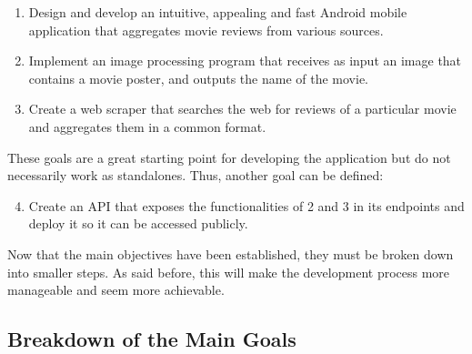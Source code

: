 \documentclass[12pt,a4paper,twoside]{report}
\begin{document}
\begin{enumerate}
    \item Design and develop an intuitive, appealing and fast Android mobile application that aggregates movie reviews from various sources.
    \item Implement an image processing program that receives as input an image that contains a movie poster, and outputs the name of the movie.
    \item Create a web scraper that searches the web for reviews of a particular movie and aggregates them in a common format.
\end{enumerate}

\noindent These goals are a great starting point for developing the application but do not necessarily work as standalones. Thus, another goal can be defined:

\begin{enumerate}
    \setcounter{enumi}{3}
    \item Create an API that exposes the functionalities of 2 and 3 in its endpoints and deploy it so it can be accessed publicly.
\end{enumerate}

Now that the main objectives have been established, they must be broken down into smaller steps. As said before, this will make the development process more manageable and seem more achievable.

\newpage

\subsection{Breakdown of the Main Goals}
\end{document}
